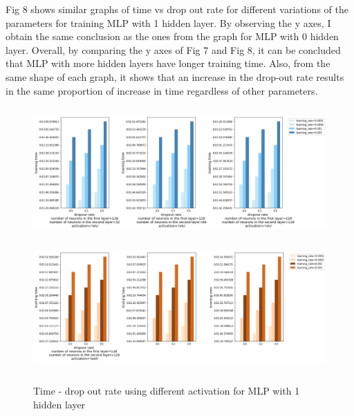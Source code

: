 \documentclass[letterpaper, 12 pt, conference]{ieeeconf}  %
\begin{document}
Fig 8 shows similar graphs of time vs drop out rate for different variations of the parameters for training MLP with 1 hidden layer. By observing the y axes, I obtain the same conclusion as the ones from the graph for MLP with 0 hidden layer. Overall, by comparing the y axes of Fig 7 and Fig 8, it can be concluded that MLP with more hidden layers have longer training time. Also, from the same shape of each graph, it shows that an increase in the drop-out rate results in the same proportion of increase in time regardless of other parameters.\\
\begin{figure}[h]
	\includegraphics[width=18cm, height=5cm]{./figs/2-layers-time-relu.png}\\
	\includegraphics[width=18cm, height=5cm]{./figs/time-tanh.png}
	\caption{Time - drop out rate using different activation for MLP with 1 hidden layer}
	\label{fig:boat1}
\end{figure}\\
\end{document}
